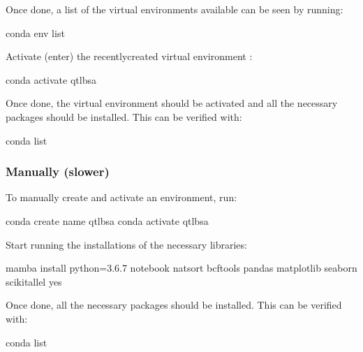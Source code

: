 \documentclass[letterpaper,10pt,english]{sphinxhowto}
\begin{document}
\sphinxAtStartPar
Once done, a list of the virtual environments available can be seen by running:

\begin{sphinxVerbatim}[commandchars=\\\{\}]
\PYGZdl{} conda env list
\end{sphinxVerbatim}

\sphinxAtStartPar
Activate (enter) the recently\sphinxhyphen{}created virtual environment :

\begin{sphinxVerbatim}[commandchars=\\\{\}]
\PYGZdl{} conda activate qtl\PYGZhy{}bsa
\end{sphinxVerbatim}

\sphinxAtStartPar
Once done, the virtual environment should be activated and all the necessary packages should be installed. This can be verified with:

\begin{sphinxVerbatim}[commandchars=\\\{\}]
\PYGZdl{} conda list
\end{sphinxVerbatim}


\subsubsection{Manually (slower)}
\label{\detokenize{index:manually-slower}}
\sphinxAtStartPar
To manually create and activate an environment, run:

\begin{sphinxVerbatim}[commandchars=\\\{\}]
\PYGZdl{} conda create \PYGZhy{}\PYGZhy{}name qtl\PYGZhy{}bsa
\PYGZdl{} conda activate qtl\PYGZhy{}bsa
\end{sphinxVerbatim}

\sphinxAtStartPar
Start running the installations of the necessary libraries:

\begin{sphinxVerbatim}[commandchars=\\\{\}]
\PYGZdl{} mamba install python=3.6.7 notebook natsort bcftools pandas matplotlib seaborn scikit\PYGZhy{}allel \PYGZhy{}\PYGZhy{}yes
\end{sphinxVerbatim}

\sphinxAtStartPar
Once done, all the necessary packages should be installed. This can be verified with:

\begin{sphinxVerbatim}[commandchars=\\\{\}]
\PYGZdl{} conda list
\end{sphinxVerbatim}
\end{document}
